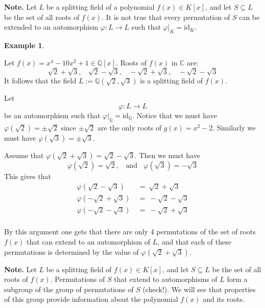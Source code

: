 \documentclass[12pt, letterpaper, oneside]{article}
\theoremstyle{plain}
\theoremstyle{definition}
\newtheorem{example}[theorem]{Example}
\newcommand{\Q}{{\mathbb Q}}
\newcommand{\C}{{\mathbb C}}
\newcommand{\id}{\mathrm{id}}
\newcommand{\vs}{\vskip 5mm}
\begin{document}
\vs\vs

\textbf{Note.} Let $L$ be a splitting field of a polynomial $f(x)\in K[x]$, and let 
$S\subseteq L$ be the set of all roots of $f(x)$. It is not true that every permutation
of $S$ can be extended to an automorphism $\varphi\colon L \to L$ such that 
$\varphi|_{K} = \id_{K}$. 


\vs\vs


\begin{example} \ 
\label{EX_AUTOQRAD2RAD3}

Let $f(x) = x^{4}-10x^{2}+1 \in \Q[x]$. Roots of $f(x)$ in $\C$ are: 
$$\sqrt{2}+\sqrt{3},  \ \ \ \  \sqrt{2}-\sqrt{3}, \ \ \ \ -\sqrt{2}+\sqrt{3}, \ \ \ \  -\sqrt{2}-\sqrt{3}$$
It follows that the field $L := \Q(\sqrt{2}, \sqrt{3})$ is a splitting 
field of $f(x)$.

Let 
$$\varphi\colon L \to L$$ 
be an automorphism such that $\varphi|_{\Q} = \id_{\Q}$. 
Notice that we must have $\varphi(\sqrt{2}) = \pm\sqrt{2}$ since $\pm\sqrt{2}$ are 
the only roots of $g(x)= x^{2}-2$.  Similarly we must have $\varphi(\sqrt{3}) = \pm\sqrt{3}$. 

Assume that $\varphi(\sqrt{2}+\sqrt{3}) = \sqrt{2}-\sqrt{3}$. Then we must have 
$$\varphi(\sqrt{2}) = \sqrt{2}, \ \ \ \ \text{and}\ \ \ \ \varphi(\sqrt{3}) = -\sqrt{3}$$
This gives that 
\begin{align*}
\varphi(\sqrt{2}-\sqrt{3}) & \ =\  \sqrt{2}+\sqrt{3} \\   
\varphi(-\sqrt{2}+\sqrt{3}) &\  =\  -\sqrt{2}-\sqrt{3} \\
\varphi(-\sqrt{2}-\sqrt{3}) &\  =\  -\sqrt{2}+\sqrt{3} \\
\end{align*}

By this argument one gets that there are only 4 permutations of the set of roots 
$f(x)$ that can extend to an automorphism of $L$, and that each of these permutations
is determined by the value of $\varphi(\sqrt{2}+\sqrt{3})$. 

\end{example}



\textbf{Note.} Let $L$ be a splitting field of $f(x)\in K[x]$, and let $S\subseteq L$
be the set of all roots of $f(x)$. Permutations of $S$ that extend to automorphisms 
of $L$ form a subgroup of the group of permutations of $S$ (check!). We will see 
that properties of this group provide information about the polynomial $f(x)$ and
its roots. 
\end{document}
